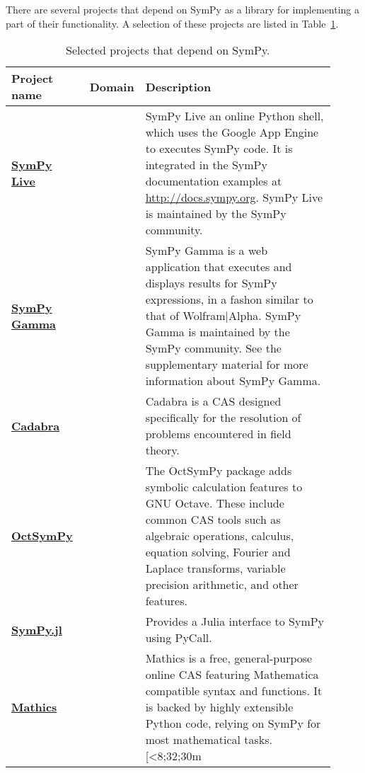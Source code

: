 There are several projects that depend on SymPy as a library for implementing
a part of their functionality. A selection of these projects are listed in
Table~\ref{projects-table}.

\begin{longtable}[htbc]{>{\raggedright}p{0.14\linewidth}p{0.14\linewidth}p{0.63\linewidth}}
\caption{Selected projects that depend on SymPy.\label{projects-table}}\\
\toprule
\textbf{Project name} & \textbf{Domain} & \textbf{Description} \\
\midrule
\href{http://live.sympy.org/}{\textbf{SymPy Live}} &  & SymPy Live an online
  Python shell, which uses the Google App Engine to executes SymPy code. It is
  integrated in the SymPy documentation examples at
  \href{http://docs.sympy.org}{http://docs.sympy.org}. SymPy Live is
  maintained by the SymPy community. \\

\href{http://sympygamma.com/}{\textbf{SymPy Gamma}} &  & SymPy Gamma is a
  web application that executes and displays results for SymPy expressions, in
  a fashon similar to that of Wolfram|Alpha. SymPy Gamma is maintained by the
  SymPy community. See the supplementary material for more information about
  SymPy Gamma. \\

\href{http://cadabra.science/index.html}{\textbf{Cadabra}}~\cite{Peeters2007cadabra} &  &
  Cadabra is a CAS designed specifically for the resolution of problems
  encountered in field theory. \\

\href{https://github.com/cbm755/octsympy}{\textbf{OctSymPy}}~\cite{OctSymPy} &  &
  The OctSymPy package adds symbolic calculation features
  to GNU Octave. These include common CAS tools such
  as algebraic operations, calculus, equation solving, Fourier and
  Laplace transforms, variable precision arithmetic, and other features. \\

\href{https://github.com/jverzani/SymPy.jl}{\textbf{SymPy.jl}}~\cite{SymPy.jl} &  &
  Provides a Julia interface to SymPy using PyCall. \\

\href{https://mathics.github.io/}{\textbf{Mathics}}~\cite{Mathics} &  & Mathics is a
  free, general-purpose online CAS featuring Mathematica compatible
  syntax and functions. It is backed by highly extensible Python code,
  relying on SymPy for most mathematical tasks.[<8;32;30m \\


\end{longtable}
